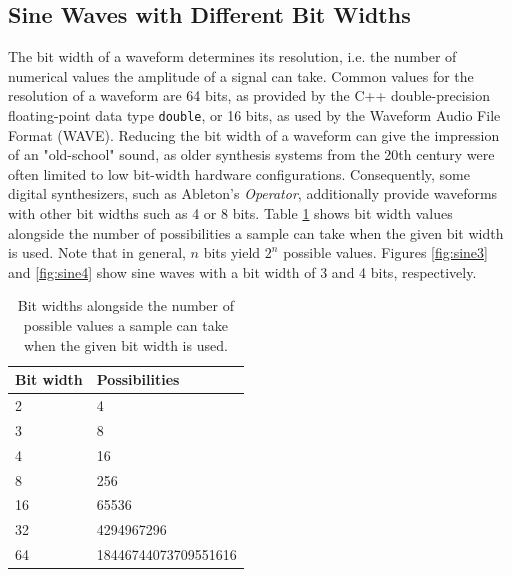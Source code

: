 \pagebreak

\subsection{Sine Waves with Different Bit Widths}

The bit width of a waveform determines its resolution, i.e. the number of numerical values the amplitude of a signal can take. Common values for the resolution of a waveform are 64 bits, as provided by the C++ double-precision floating-point data type \texttt{double}, or 16 bits, as used by the Waveform Audio File Format (WAVE). Reducing the bit width of a waveform can give the impression of an "old-school" sound, as older synthesis systems from the 20th century were often limited to low bit-width hardware configurations. Consequently, some digital synthesizers, such as Ableton's\footnotemark{} \emph{Operator}, additionally provide waveforms with other bit widths such as 4 or 8 bits. Table \ref{tb:bitw} shows bit width values alongside the number of possibilities a sample can take when the given bit width is used. Note that in general, $n$ bits yield $2^n$ possible values. Figures \ref{fig:sine3} and \ref{fig:sine4} show sine waves with a bit width of 3 and 4 bits, respectively.


\begin{table}[th!]

  \centering

  \begin{tabular}[]{| l | l |}
    \hline
    \rowcolor[gray]{0.8}
    Bit width & Possibilities\\\hline
    2 & 4\\\hline
    3 & 8\\\hline
    4 & 16\\\hline
    8 & 256\\\hline
    16 & 65536\\\hline
    32 & 4294967296\\\hline
    64 & 18446744073709551616\\
    \hline
  \end{tabular}

  \caption{Bit widths alongside the number of possible values a sample can take when the given bit width is used.}

  \label{tb:bitw}

\end{table}

